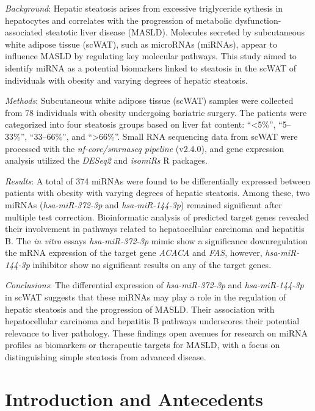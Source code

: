 \documentclass[
  11pt,
  letterpaper,
]{book}
\begin{document}
\emph{Background}: Hepatic steatosis arises from excessive triglyceride
sythesis in hepatocytes and correlates with the progression of metabolic
dysfunction-associated steatotic liver disease (MASLD). Molecules
secreted by subcutaneous white adipose tissue (scWAT), such as microRNAs
(miRNAs), appear to influence MASLD by regulating key molecular
pathways. This study aimed to identify miRNA as a potential biomarkers
linked to steatosis in the scWAT of individuals with obesity and varying
degrees of hepatic steatosis.

\emph{Methods}: Subcutaneous white adipose tissue (scWAT) samples were
collected from 78 individuals with obesity undergoing bariatric surgery.
The patients were categorized into four steatosis groups based on liver
fat content: ``\textless5\%'', ``5--33\%'', ``33--66\%'', and
``\textgreater66\%''. Small RNA sequencing data from scWAT were
processed with the \emph{nf-core/smrnaseq pipeline} (v2.4.0), and gene
expression analysis utilized the \emph{DESeq2} and \emph{isomiRs} R
packages.

\emph{Results}: A total of 374 miRNAs were found to be differentially
expressed between patients with obesity with varying degrees of hepatic
steatosis. Among these, two miRNAs (\emph{hsa-miR-372-3p} and
\emph{hsa-miR-144-3p}) remained significant after multiple test
correction. Bioinformatic analysis of predicted target genes revealed
their involvement in pathways related to hepatocellular carcinoma and
hepatitis B. The \emph{in vitro} essays \emph{hsa-miR-372-3p} mimic show
a significance downregulation the mRNA expression of the target gene
\emph{ACACA} and \emph{FAS}, however, \emph{hsa-miR-144-3p} inihibitor
show no significant results on any of the target genes.

\emph{Conclusions}: The differential expression of \emph{hsa-miR-372-3p}
and \emph{hsa-miR-144-3p} in scWAT suggests that these miRNAs may play a
role in the regulation of hepatic steatosis and the progression of
MASLD. Their association with hepatocellular carcinoma and hepatitis B
pathways underscores their potential relevance to liver pathology. These
findings open avenues for research on miRNA profiles as biomarkers or
therapeutic targets for MASLD, with a focus on distinguishing simple
steatosis from advanced disease.

\tableofcontents
\listoftables
\listoffigures

\mainmatter

\chapter{Introduction and
Antecedents}\label{introduction-and-antecedents}
\end{document}
